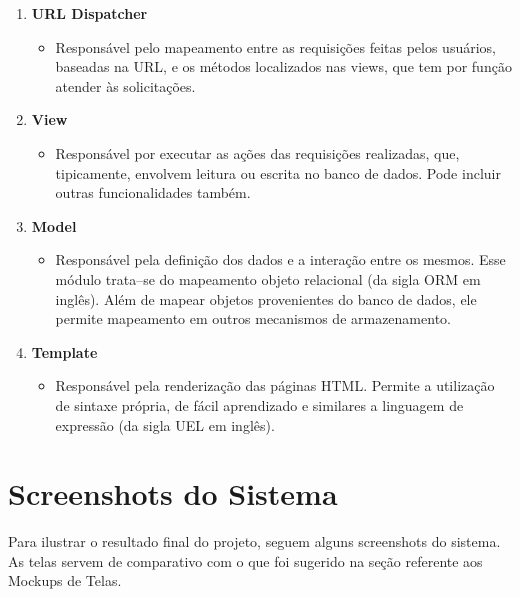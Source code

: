 \documentclass[graduacao,brazil]{ThesisPUC}
\begin{document}
\begin{enumerate}
    \item \textbf{URL Dispatcher}
    \begin{itemize}
	\item Respons\'{a}vel pelo mapeamento entre as requisi\c{c}\~{o}es feitas pelos usu\'{a}rios, baseadas na URL, 
	      e os m\'{e}todos localizados nas views, que tem por fun\c{c}\~{a}o atender \`{a}s solicita\c{c}\~{o}es.
    \end{itemize}
    \item \textbf{View}
    \begin{itemize}
	\item Respons\'{a}vel por executar as a\c{c}\~{o}es das requisi\c{c}\~{o}es realizadas, que, tipicamente,
	      envolvem leitura ou escrita no banco de dados. Pode incluir outras funcionalidades tamb\'{e}m.
    \end{itemize}
    \item \textbf{Model}
    \begin{itemize}
	\item Respons\'{a}vel pela defini\c{c}\~{a}o dos dados e a intera\c{c}\~{a}o entre os mesmos. Esse m\'{o}dulo
	      trata--se do mapeamento objeto relacional (da sigla ORM em ingl\^{e}s). Além de mapear objetos provenientes
	      do banco de dados, ele permite mapeamento em outros mecanismos de armazenamento.
    \end{itemize}
    \item \textbf{Template}
    \begin{itemize}
	\item Respons\'{a}vel pela renderiza\c{c}\~{a}o das p\'{a}ginas HTML. Permite a utiliza\c{c}\~{a}o de sintaxe
	      pr\'{o}pria, de f\'{a}cil aprendizado e similares a linguagem de express\~{a}o (da sigla UEL em ingl\^{e}s).
    \end{itemize}
\end{enumerate}


\section{Screenshots do Sistema}

Para ilustrar o resultado final do projeto, seguem alguns screenshots do sistema.
As telas servem de comparativo com o que foi sugerido na se\c{c}\~{a}o referente aos Mockups de Telas.
\end{document}
